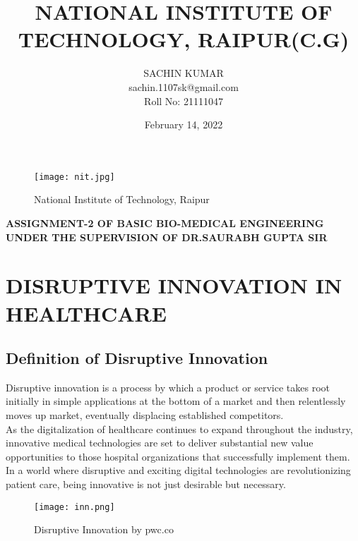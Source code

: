 \documentclass[12pts]{article}
\title{\textbf{NATIONAL INSTITUTE OF TECHNOLOGY, RAIPUR(C.G)}}
\author{SACHIN KUMAR \\sachin.1107sk@gmail.com\\Roll No: 21111047}
\date{February 14, 2022}
\begin{document}
\maketitle

\begin{figure}[h]
\centering
\texttt{[image: nit.jpg]}
\caption{National Institute of Technology, Raipur}
\end{figure}

\textbf{ASSIGNMENT-2 OF BASIC BIO-MEDICAL ENGINEERING}\\
\textbf{UNDER THE SUPERVISION OF DR.SAURABH GUPTA SIR}

\clearpage
\section*{DISRUPTIVE INNOVATION IN HEALTHCARE}


\subsection*{Definition of Disruptive Innovation}
\begin{large} Disruptive innovation is a process by which a product or service takes root initially in simple applications at the bottom of a market and then relentlessly moves up market, eventually displacing established competitors.\\ As the digitalization of healthcare continues to expand throughout the industry, innovative medical technologies are set to deliver substantial new value opportunities to those hospital organizations that successfully implement them. In a world where disruptive and exciting digital technologies are revolutionizing patient care, being innovative is not just desirable but necessary. 
\end{large}
\begin{figure}[h]
\centering
\texttt{[image: inn.png]}
\caption{Disruptive Innovation by pwc.co  }
\end{figure}
\end{document}
